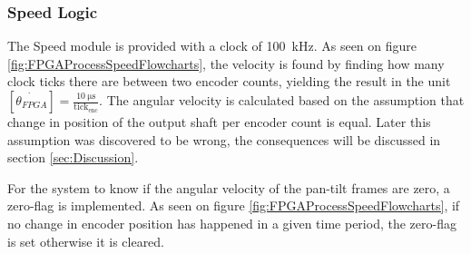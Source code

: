 \documentclass[../../main.tex]{subfiles}
\begin{document}
\subsubsection*{Speed Logic}
The Speed module is provided with a clock of \SI{100}{\kilo \hertz}. As seen on figure \ref{fig:FPGAProcessSpeedFlowcharts}, the velocity is found by finding how many clock ticks there are between two encoder counts, yielding the result in the unit $\left[\dot{\theta_{FPGA}}\right] = \frac{\SI{10}{\micro \second}}{\mathrm{tick_{enc}}}$. The angular velocity is calculated based on the assumption that change in position of the output shaft per encoder count is equal. Later this assumption was discovered to be wrong, the consequences will be discussed in section \ref{sec:Discussion}.

For the system to know if the angular velocity of the pan-tilt frames are zero, a zero-flag is implemented. As seen on figure \ref{fig:FPGAProcessSpeedFlowcharts}, if no change in encoder position has happened in a given time period, the zero-flag is set otherwise it is cleared.


    
\end{document}
